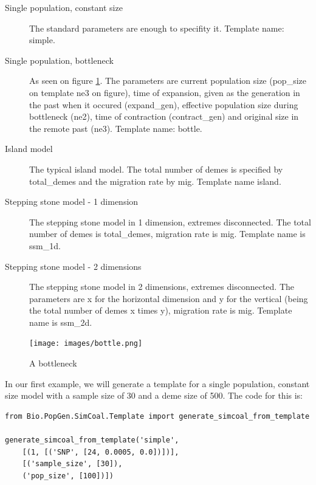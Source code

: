 \documentclass{report}
\begin{document}
\begin{description}
\item[Single population, constant size] The standard parameters are enough to specifity
it. Template name: simple.
\item[Single population, bottleneck] As seen on figure \ref{fig:bottle}. The parameters
are current population size (pop\_size on template ne3 on figure), time of expansion,
given as the generation in the past when it occured (expand\_gen), 
effective population size during bottleneck (ne2), time of contraction
(contract\_gen) and original size in the remote past (ne3). Template name: bottle.
\item[Island model] The typical island model. The total number of demes is specified
by total\_demes and the migration rate by mig. Template name island.
\item[Stepping stone model - 1 dimension] The stepping stone model in 1 dimension,
extremes disconnected. The total number of demes is total\_demes, migration rate
is mig. Template name is ssm\_1d.
\item[Stepping stone model - 2 dimensions] The stepping stone model in 2 dimensions,
extremes disconnected. The parameters are x for the horizontal dimension and y
for the vertical (being the total number of demes x times y), migration rate is mig.
Template name is ssm\_2d.
\end{description}

\begin{htmlonly}
\label{fig:bottle}
\end{htmlonly}

\begin{latexonly}
\begin{figure}[htbp]
\centering
\texttt{[image: images/bottle.png]}
\caption{A bottleneck}
\label{fig:bottle}
\end{figure}
\end{latexonly}

In our first example, we will generate a template for a single population, constant size
model with a sample size of 30 and a deme size of 500. The code for this is:

\begin{verbatim}
from Bio.PopGen.SimCoal.Template import generate_simcoal_from_template

generate_simcoal_from_template('simple',
    [(1, [('SNP', [24, 0.0005, 0.0])])],
    [('sample_size', [30]),
    ('pop_size', [100])])
\end{verbatim}
\end{document}
